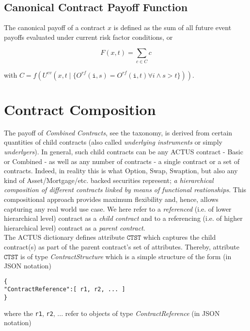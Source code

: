 \documentclass[9pt,oneside]{amsart}
\newcommand{\attr}[1]{\texttt{#1}}
\newcommand{\obs}[3]{O^{#1}(#2,#3)}
\newcommand{\cldev}[3]{U^{ev}(#1,#2 \mid\{#3\})}
\newcommand{\fev}[1]{f(#1)}
\newcommand{\payoff}[2]{F(#1,#2)}
\begin{document}
\begin{multicols}{2}
\subsection{Canonical Contract Payoff Function}

The canonical payoff of a contract $x$ is defined as the sum of all future event payoffs evaluated under current risk factor conditions, or

\[
  \payoff{x}{t} = \sum_{c\in C} c
\]

with $C=\fev{\cldev{x}{t}{\obs{rf}{\attr{i}}{s}=\obs{rf}{\attr{i}}{t}\forall i \wedge s>t}}$.



\section{Contract Composition}\label{sec:composition}

The payoff of \textit{Combined Contracts}, see the taxonomy, is derived from certain quantities of child contracts (also called \textit{underlying instruments} or simply \textit{underlyers}). In general, such child contracts can be any ACTUS contract - Basic or Combined - as well as any number of contracts - a single contract or a set of contracts. Indeed, in reality this is what Option, Swap, Swaption, but also any kind of Asset/Mortgage/etc. backed securities represent; \textit{a hierarchical composition of different contracts linked by means of functional reationships}. This compositional approach provides maximum flexibility and, hence, allows capturing any real world use case. We here refer to a \textit{referenced} (i.e. of lower hierarchical level) contract as a \textit{child contract} and to a referencing (i.e. of higher hierarchical level) contract as a \textit{parent contract}.\\

The ACTUS dictionary defines attribute $\attr{CTST}$ which captures the child contract(s) as part of the parent contract's set of attributes. Thereby, attribute $\attr{CTST}$ is of type \textit{ContractStructure} which is a simple structure of the form (in JSON notation)

\begin{verbatim}
{
"ContractReference":[ r1, r2, ... ]
}
\end{verbatim}

where the \verb'r1', \verb'r2', ... refer to objects of type \textit{ContractReference} (in JSON notation)


\end{multicols}
\end{document}
